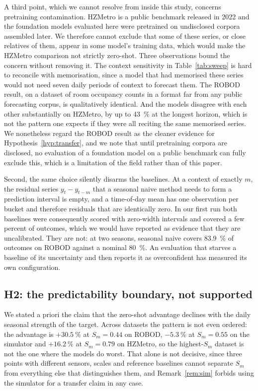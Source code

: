 \documentclass[utf8]{FrontiersinHarvard}
\newif\ifrevisionmarkup
\newcommand{\new}[1]{\ifrevisionmarkup\textcolor{revision}{#1}\else#1\fi}
\newif\ifsecondrevisionmarkup
\newcommand{\rev}[1]{\ifsecondrevisionmarkup\textcolor{revisiontwo}{#1}\else#1\fi}
\theoremstyle{plain}
\theoremstyle{definition}
\theoremstyle{remark}
\begin{document}
\new{A third point, which we cannot resolve from inside this study, concerns pretraining contamination. HZMetro is a public benchmark released in 2022 and the foundation models evaluated here were pretrained on undisclosed corpora assembled later. We therefore cannot exclude that some of these series, or close relatives of them, appear in some model's training data, which would make the HZMetro comparison not strictly zero-shot. Three observations bound the concern without removing it. The context sensitivity in Table~\ref{tab:sweep} is hard to reconcile with memorisation, since a model that had memorised these series would not need seven daily periods of context to forecast them. The ROBOD result, on a dataset of room occupancy counts in a format far from any public forecasting corpus, is qualitatively identical. And the models disagree with each other substantially on HZMetro, by up to \SI{43}{\percent} at the longest horizon, which is not the pattern one expects if they were all reciting the same memorised series. We nonetheless regard the ROBOD result as the cleaner evidence for Hypothesis~\ref{hyp:transfer}, and we note that until pretraining corpora are disclosed, no evaluation of a foundation model on a public benchmark can fully exclude this, which is a limitation of the field rather than of this paper.}

Second, the same choice silently disarms the baselines. At a context of exactly $m$, the residual series $y_t - y_{t-m}$ that a seasonal naive method needs to form a prediction interval is empty, and a time-of-day mean has one observation per bucket and therefore residuals that are identically zero. In our first run both baselines were consequently scored with zero-width intervals and covered a few percent of outcomes, which we would have reported as evidence that they are uncalibrated. They are not: at two seasons, seasonal naive covers \SI{83.9}{\percent} of outcomes on ROBOD against a nominal \SI{80}{\percent}. An evaluation that starves a baseline of its uncertainty and then reports it as overconfident has measured its own configuration.

\subsection{H2: the predictability boundary, \rev{not supported}}

We \new{stated a priori} the claim that the zero-shot advantage declines with the daily seasonal strength of the target. Across datasets the pattern is not even ordered: the advantage is $+\SI{30.5}{\percent}$ at $S_m=0.44$ on ROBOD, $-\new{\SI{5.3}{\percent}}$ at $S_m=0.55$ on the simulator and $+\SI{16.2}{\percent}$ at $S_m=0.79$ on HZMetro, so the highest-$S_m$ dataset is not the one where the models do worst. That alone is not decisive, since three points with different sensors, scales and reference baselines cannot separate $S_m$ from everything else that distinguishes them, and Remark~\ref{rem:sim} forbids using the simulator for a transfer claim in any case.
\end{document}
